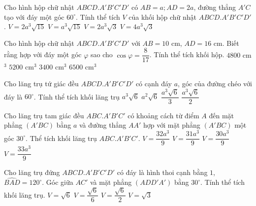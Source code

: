 \begin{ex}%
	Cho hình hộp chữ nhật $ABCD.A'B'C'D'$ có $AB=a;AD=2a$, đường thẳng $A'C$ tạo với đáy một góc $60^{\circ}$. Tính thể tích $V$ của khối hộp chữ nhật $ABCD.A'B'C'D'$. 
	\choice
	{\True $V=2a^3\sqrt{15}$}
	{$V=a^3\sqrt{15}$}
	{$V=2a^3\sqrt{3}$}
	{$V=4a^3\sqrt{3}$}
\end{ex}

\begin{ex}%
	Cho hình hộp chữ nhật $ABCD.A'B'C'D'$ với $AB=10$ cm, $AD=16$ cm. Biết rằng hợp với đáy một góc $\varphi$ sao cho $\cos\varphi=\dfrac{8}{17}$. Tính thể tích khối hộp. 
	\choice
	{\True $4800$ cm$^3$}
	{$5200$ cm$^3$}
	{$3400$ cm$^3$}
	{$6500$ cm$^3$}
\end{ex}

\begin{ex}%
	Cho lăng trụ tứ giác đều $ABCD.A'B'C'D'$ có cạnh đáy $a$, góc của đường chéo với đáy là $60^{\circ}$. Tính thể tích khối lăng trụ
	\choice
	{\True $a^3\sqrt{6}$}
	{$a^2\sqrt{6}$}
	{$\dfrac{a^3\sqrt{6}}{3}$}
	{$\dfrac{a^3\sqrt{6}}{2}$}
\end{ex}

\begin{ex}%
	Cho lăng trụ tam giác đều $ABC.A'B'C'$ có khoảng cách từ điểm $A$ đến mặt phẳng $(A'BC)$ bằng $a$ và đường thẳng $AA'$ hợp với mặt phẳng $(A'BC)$ một góc $30^{\circ}$. Thể tích khối lăng trụ $ABC.A'B'C'$. 
	\choice
	{\True $V=\dfrac{32a^3}{9}$}
	{$V=\dfrac{31a^3}{9}$}
	{$V=\dfrac{30a^3}{9}$}
	{$V=\dfrac{33a^3}{9}$}
\end{ex}

\begin{ex}%
	Cho lăng trụ đứng $ABCD.A'B'C'D'$ có đáy là hình thoi cạnh bằng $1$, $\widehat{BAD}=120^{\circ}$. Góc giữa $AC'$ và mặt phẳng $(ADD'A')$ bằng $30^{\circ}$. Tính thể tích khối lăng trụ. 
	\choice
	{\True $V=\sqrt{6}$}
	{$V=\dfrac{\sqrt{6}}{6}$}
	{$V=\dfrac{\sqrt{6}}{2}$}
	{$V=\sqrt{3}$}
\end{ex}

